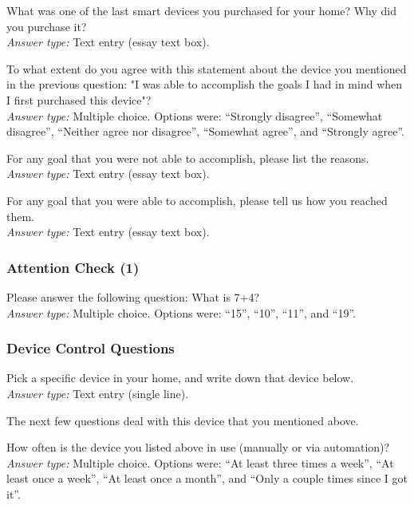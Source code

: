 \printQcounter{} What was one of the last smart devices you purchased for your home? Why did you purchase it? \\
\textit{Answer type:} Text entry (essay text box).

\printQcounter{} To what extent do you agree with this statement about the device you mentioned in the previous question: "I was able to accomplish the goals I had in mind when I first purchased this device"? \\
\textit{Answer type:} Multiple choice. Options were: ``Strongly disagree'', ``Somewhat disagree'', ``Neither agree nor disagree'', ``Somewhat agree'', and ``Strongly agree''.

\printQcounter{} For any goal that you were not able to accomplish, please list the reasons. \\
\textit{Answer type:} Text entry (essay text box).

\printQcounter{} For any goal that you were able to accomplish, please tell us how you reached them. \\
\textit{Answer type:} Text entry (essay text box).

\subsubsection{Attention Check (1)}

\printQcounter{} Please answer the following question: What is 7+4? \\
\textit{Answer type:} Multiple choice. Options were: ``15'', ``10'', ``11'', and ``19''.

\subsubsection{Device Control Questions}
\label{appdx:survey:control}

\printQcounter{} Pick a specific device in your home, and write down that device below.\\
\textit{Answer type:} Text entry (single line).

The next few questions deal with this device that you mentioned above.

\printQcounter{} How often is the device you listed above in use (manually or via automation)? \\
\textit{Answer type:} Multiple choice. Options were: ``At least three times a week'', ``At least once a week'', ``At least once a month'', and ``Only a couple times since I got it''.

